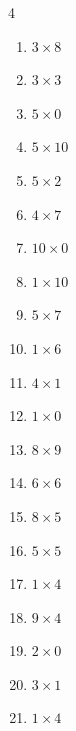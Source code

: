 \begin{multicols}{4}
\begin{enumerate}
  \item $3\times 8$
        \phantom{$=24$}

  \item $3\times 3$
        \phantom{$=9$}

  \item $5\times 0$
        \phantom{$=0$}

  \item $5\times 10$
        \phantom{$=50$}

  \item $5\times 2$
        \phantom{$=10$}

  \item $4\times 7$
        \phantom{$=28$}

  \item $10\times 0$
        \phantom{$=0$}

  \item $1\times 10$
        \phantom{$=10$}

  \item $5\times 7$
        \phantom{$=35$}

  \item $1\times 6$
        \phantom{$=6$}

  \item $4\times 1$
        \phantom{$=4$}

  \item $1\times 0$
        \phantom{$=0$}

  \item $8\times 9$
        \phantom{$=72$}

  \item $6\times 6$
        \phantom{$=36$}

  \item $8\times 5$
        \phantom{$=40$}

  \item $5\times 5$
        \phantom{$=25$}

  \item $1\times 4$
        \phantom{$=4$}

  \item $9\times 4$
        \phantom{$=36$}

  \item $2\times 0$
        \phantom{$=0$}

  \item $3\times 1$
        \phantom{$=3$}

  \item $1\times 4$
        \phantom{$=4$}


\end{enumerate}
\end{multicols}
